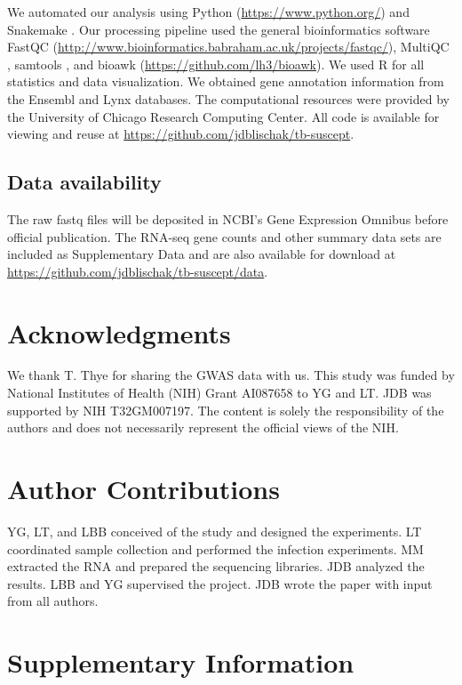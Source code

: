 We automated our analysis using Python (\url{https://www.python.org/})
and Snakemake \citep{Koster2012}. Our processing pipeline used the
general bioinformatics software FastQC
(\url{http://www.bioinformatics.babraham.ac.uk/projects/fastqc/}),
MultiQC \citep{Ewels2016}, samtools \citep{Li2009}, and bioawk
(\url{https://github.com/lh3/bioawk}). We used R \citep{R2015} for all
statistics and data visualization. We obtained gene annotation
information from the Ensembl \citep{Yates2016} and Lynx
\citep{Sulakhe2016} databases. The computational resources were
provided by the University of Chicago Research Computing Center. All
code is available for viewing and reuse at
\url{https://github.com/jdblischak/tb-suscept}.
\subsection{Data availability}

The raw fastq files will be deposited in NCBI's Gene Expression
Omnibus \citep{Edgar2002} before official publication.  The RNA-seq
gene counts and other summary data sets are included as Supplementary
Data and are also available for download at
\url{https://github.com/jdblischak/tb-suscept/data}.
\section{Acknowledgments}

We thank T. Thye for sharing the GWAS data with us. This study was
funded by National Institutes of Health (NIH) Grant AI087658 to YG and
LT. JDB was supported by NIH T32GM007197. The content is solely the
responsibility of the authors and does not necessarily represent the
official views of the NIH.
\section{Author Contributions}

YG, LT, and LBB conceived of the study and designed the experiments.
LT coordinated sample collection and performed the infection
experiments. MM extracted the RNA and prepared the sequencing
libraries. JDB analyzed the results. LBB and YG supervised the
project. JDB wrote the paper with input from all authors.

\section{Supplementary Information}\label{ch03-supplementary-information}

